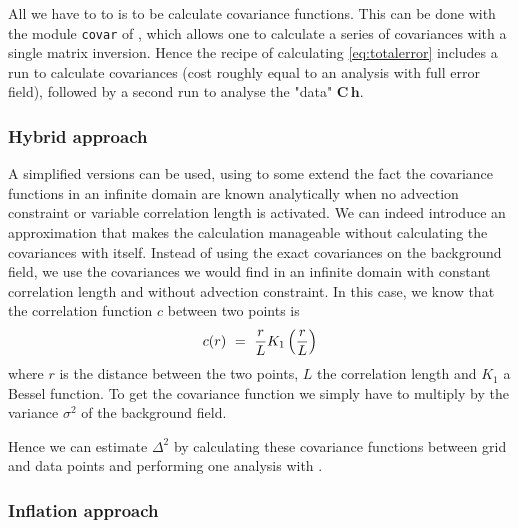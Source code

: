 All we have to to is to be calculate covariance functions. This can be done with the module {\tt covar} of \diva, which allows one to calculate
a series of covariances with a single matrix inversion. Hence the recipe of calculating \eqref{eq:totalerror} includes a \diva run to calculate covariances (cost roughly equal to an analysis with full error field), followed by a second \diva run to analyse the "data" $\mathbf{C}  \, \mathbf{h}$.



\subsubsection{Hybrid approach}

A simplified versions can be used, using to some extend the fact the covariance functions in an infinite domain are known analytically when no
advection constraint or variable correlation length is activated. We can indeed introduce an approximation that makes the calculation manageable without calculating the covariances with \diva itself. Instead of using the exact covariances on the background field, we use the covariances we would find in an infinite domain with constant correlation length and without advection constraint. In this case, we know
that the correlation function $c$ between two points is
\begin{equation}
c(r) ~=~{r \over L} K_1 \left(r \over L\right)
\end{equation}
where $r$ is the distance between the two points, $L$ the correlation length and $K_1$ a Bessel function. To get the covariance function we simply have to multiply by the variance $\sigma^2$ of the background field.

Hence we can estimate $\Delta^2$ by calculating these covariance functions between grid and data points and performing one analysis with \diva.

\subsubsection{Inflation approach}

